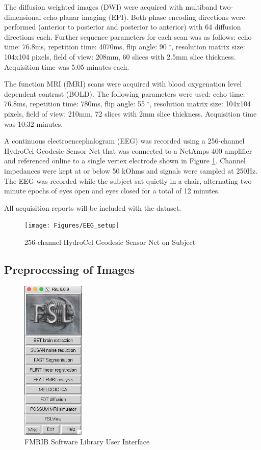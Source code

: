 The diffusion weighted images (DWI) were acquired with multiband two-dimensional echo-planar imaging (EPI). Both phase encoding directions were performed (anterior to posterior and posterior to anterior) with 64 diffusion directions each. Further sequence parameters for each scan was as follows: echo time: 76.8ms, repetition time: 4070ms, flip angle: 90 $^{\circ}$, resolution matrix size: 104x104 pixels, field of view: 208mm, 60 slices with 2.5mm slice thickness. Acquisition time was 5:05 minutes each. 

The function MRI (fMRI) scans were acquired with blood oxygenation level dependent contrast (BOLD). The following parameters were used:  echo time: 76.8ms, repetition time: 780ms, flip angle: 55 $^{\circ}$, resolution matrix size: 104x104 pixels, field of view: 210mm, 72 slices with 2mm slice thickness. Acquisition time was 10:32 minutes.

A continuous electroencephalogram (EEG) was recorded using a 256-channel HydroCel Geodesic Sensor Net that was connected to a NetAmps 400 amplifier and referenced online to a single vertex electrode shown in Figure \ref{fig:eegsetup}. Channel impedances were kept at or below 50 kOhms and signals were sampled at 250Hz. The EEG was recorded while the subject sat quietly in a chair, alternating two minute epochs of eyes open and eyes closed for a total of 12 minutes. 

All acquisition reports will be included with the dataset. 

\begin{figure}[!th]
    \centering
    \texttt{[image: Figures/EEG\_setup]}
    \caption{256-channel HydroCel Geodesic Sensor Net on Subject}
    \label{fig:eegsetup}
\end{figure}

\subsection{Preprocessing of Images}
\label{sec:preprocess}

\begin{figure}
    \centering
    \vspace{-35pt}
    \includegraphics[width=3cm]{Figures/FSL}
    \caption{FMRIB Software Library User Interface}
    \label{fig:fsl}
\end{figure}

